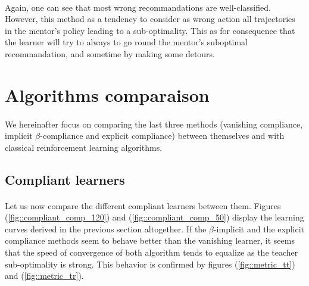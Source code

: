 \documentclass[a4paper]{report}
\begin{document}
{{{{			\paragraph{} Again, one can see that most wrong recommandations are well-classified. However, this method as a tendency to consider as wrong action all trajectories in the mentor's policy leading to a sub-optimality. This as for consequence that the learner will try to always to go round the mentor's suboptimal recommandation, and sometime by making some detours. 
			}
		}
		\section{Algorithms comparaison}
		{
			\label{sec_method_comp}
			\paragraph{} We hereinafter focus on comparing the last three methods (vanishing compliance, implicit $\beta$-compliance and explicit compliance) between themselves and with classical reinforcement learning algorithms. 
			
			\subsection{Compliant learners}
			{
				\paragraph{} Let us now compare the different compliant learners between them. Figures (\ref{fig::compliant_comp_120}) and (\ref{fig::compliant_comp_50}) display the learning curves derived in the previous section altogether. If the $\beta$-implicit and the explicit compliance methods seem to behave better than the vanishing learner, it seems that the speed of convergence of both algorithm tends to equalize as the teacher sub-optimality is strong. This behavior is confirmed by figures (\ref{fig::metric_tt}) and (\ref{fig::metric_tr}). 
				
}}}}
\end{document}
